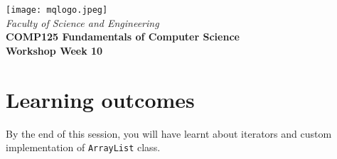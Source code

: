 \documentclass{exam}
\begin{document}

%
\vspace{0.2in}
\begin{center}
        {\large  %
\texttt{[image: mqlogo.jpeg]}\\
\medskip
        {\it  Faculty of Science and Engineering\\}
        \vspace{0.2in}
         {\bf COMP125 Fundamentals of Computer Science\\
        Workshop Week 10\\}}
\end{center}
\vspace{0.3in}
%

\renewcommand{\labelenumi}{\alph{enumi}.}
 
\section* {Learning outcomes}

By the end of this session, you will have learnt about iterators and custom implementation of \texttt{ArrayList} class. 
\end{document}
